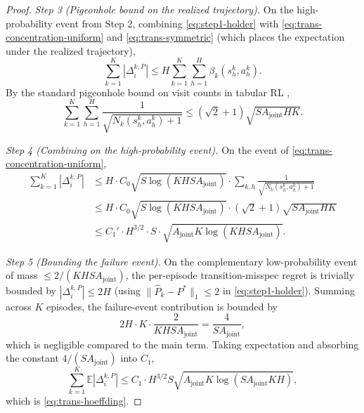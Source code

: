 \begin{proof}
\textit{Step 3 (Pigeonhole bound on the realized trajectory).} On the high-probability event from Step 2, combining \eqref{eq:step1-holder} with \eqref{eq:trans-concentration-uniform} and \eqref{eq:trans-symmetric} (which places the expectation under the realized trajectory),
\begin{equation}
\sum_{k=1}^K |\Delta_i^{k,P}| \leq H \sum_{k=1}^K \sum_{h=1}^H \beta_k(s_h^k, a_h^k).
\end{equation}
By the standard pigeonhole bound on visit counts in tabular RL \citep[Lemma 19]{jaksch2010near},
\begin{equation}
\label{eq:pigeonhole}
\sum_{k=1}^K \sum_{h=1}^H \frac{1}{\sqrt{N_k(s_h^k, a_h^k) + 1}} \leq (\sqrt{2} + 1) \sqrt{S A_{\mathrm{joint}} H K}.
\end{equation}

\textit{Step 4 (Combining on the high-probability event).} On the event of \eqref{eq:trans-concentration-uniform},
\begin{align}
\sum_{k=1}^K |\Delta_i^{k,P}| &\leq H \cdot C_0 \sqrt{S \log(KH SA_{\mathrm{joint}})} \cdot \sum_{k, h} \frac{1}{\sqrt{N_k(s_h^k, a_h^k) + 1}} \\
&\leq H \cdot C_0 \sqrt{S \log(KH SA_{\mathrm{joint}})} \cdot (\sqrt{2}+1) \sqrt{S A_{\mathrm{joint}} H K} \\
&\leq C_1' \cdot H^{3/2} \cdot S \cdot \sqrt{A_{\mathrm{joint}} K \log(KH SA_{\mathrm{joint}})}.
\end{align}

\textit{Step 5 (Bounding the failure event).} On the complementary low-probability event of mass $\leq 2/(KH SA_{\mathrm{joint}})$, the per-episode transition-misspec regret is trivially bounded by $|\Delta_i^{k,P}| \leq 2H$ (using $\|\hat{P}_k - P^*\|_1 \leq 2$ in \eqref{eq:step1-holder}). Summing across $K$ episodes, the failure-event contribution is bounded by
\begin{equation}
2H \cdot K \cdot \frac{2}{KH SA_{\mathrm{joint}}} = \frac{4}{SA_{\mathrm{joint}}},
\end{equation}
which is negligible compared to the main term. Taking expectation and absorbing the constant $4/(SA_{\mathrm{joint}})$ into $C_1$,
\begin{equation}
\sum_{k=1}^K \mathbb{E}|\Delta_i^{k,P}| \leq C_1 \cdot H^{3/2} S \sqrt{A_{\mathrm{joint}} K \log(SA_{\mathrm{joint}}KH)},
\end{equation}
which is \eqref{eq:trans-hoeffding}.
\end{proof}

